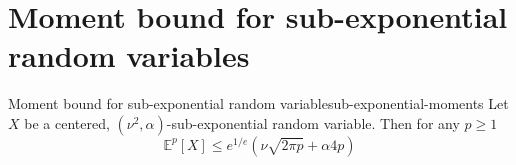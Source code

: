 
\section{Moment bound for sub-exponential random variables}

\begin{lemma}{Moment bound for sub-exponential random variable}{sub-exponential-moments}
    Let $X$ be a centered, $(\nu^2, \alpha)$-sub-exponential random variable. Then for any $p \geq 1$
    \begin{equation}
        \mathbb{E}^p[X] \leq e^{1/e} (\nu \sqrt{2 \pi p} + \alpha 4 p)
    \end{equation}
\end{lemma}

